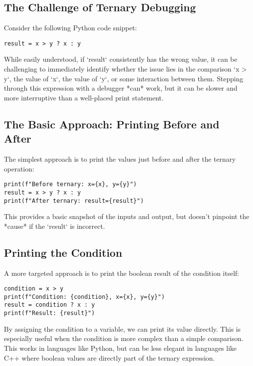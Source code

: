 \documentclass{article}
\begin{document}
{{{{\subsection*{The Challenge of Ternary Debugging}

Consider the following Python code snippet:

\begin{verbatim}
result = x > y ? x : y
\end{verbatim}

While easily understood, if `result` consistently has the wrong value, it can be challenging to immediately identify whether the issue lies in the comparison `x > y`, the value of `x`, the value of `y`, or some interaction between them.  Stepping through this expression with a debugger *can* work, but it can be slower and more interruptive than a well-placed print statement.

\subsection*{The Basic Approach: Printing Before and After}

The simplest approach is to print the values just before and after the ternary operation:

\begin{verbatim}
print(f"Before ternary: x={x}, y={y}")
result = x > y ? x : y
print(f"After ternary: result={result}")
\end{verbatim}

This provides a basic snapshot of the inputs and output, but doesn't pinpoint the *cause* if the `result` is incorrect.

\subsection*{Printing the Condition}

A more targeted approach is to print the boolean result of the condition itself:

\begin{verbatim}
condition = x > y
print(f"Condition: {condition}, x={x}, y={y}")
result = condition ? x : y
print(f"Result: {result}")
\end{verbatim}

By assigning the condition to a variable, we can print its value directly. This is especially useful when the condition is more complex than a simple comparison.  This works in languages like Python, but can be less elegant in languages like C++ where boolean values are directly part of the ternary expression.

}}}}
\end{document}
